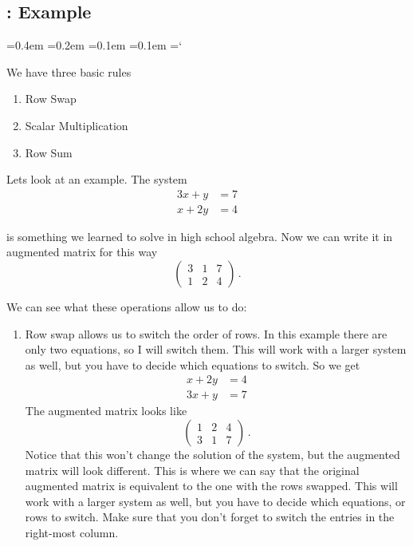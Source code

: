 
\subsection{\elemRowOpsTitle: Example}

{\ttfamily
{}\font=0.4em
\font=0.2em
\font=0.1em
\font=0.1em
\hyphenchar\font=`\-


\hypertarget{script_elementary_row_operations_example}{We have three basic rules} 
\begin{enumerate}
\item Row Swap
\item Scalar Multiplication
\item Row Sum
\end{enumerate}

Lets look at an example. The system 
\begin{align*}
 3x + y & = 7\\
 x + 2y & = 4
\end{align*}

is something we learned to solve in high school algebra. Now we can write it in augmented matrix for this way
\[
\left( \begin{array}{cc|c}
3 & 1 & 7 \\
1 & 2 & 4  
\end{array} \right)\, .
\]

We can see what these operations allow us to do:
\begin{enumerate}
\item Row swap allows us to switch the order of rows. In this example there are only two equations, so I will switch them. This will work with a larger system as well, but you have to decide which equations to switch. So we get
\begin{align*}
 x + 2y &= 4 \\
3x + y &= 7
\end{align*}
The augmented matrix looks like 
\[
\left( \begin{array}{cc|c}
1 & 2 & 4 \\
3 & 1 & 7
\end{array} \right)\, .
\]
Notice that this won't change the solution of the system, but the augmented matrix will look different. This is where we can say that the original augmented matrix is equivalent to the one with the rows swapped.
This will work with a larger system as well, but you have to decide which equations, or rows to switch. Make sure that you don't forget to switch the entries in the right-most column.


\end{enumerate}}
